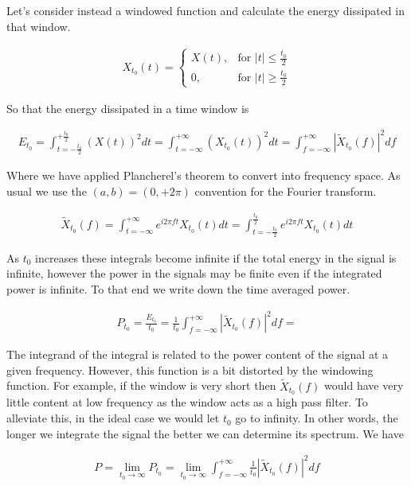 \documentclass[12pt]{article}
\begin{document}
Let's consider instead a windowed function and calculate the energy dissipated in that window.

\begin{align}
X_{t_0}(t) =
\begin{cases}
X(t), & \text{for } |t|\le \frac{t_0}{2}\\
0, & \text{for } |t|\ge \frac{t_0}{2}
\end{cases}
\end{align}

So that the energy dissipated in a time window is

\begin{align}
E_{t_0} = \int_{t=-\frac{t_0}{2}}^{+\frac{t_0}{2}} (X(t))^2 dt = \int_{t=-\infty}^{+\infty} (X_{t_0}(t))^2 dt = \int_{f=-\infty}^{+\infty} |\tilde{X}_{t_0}(f)|^2 df
\end{align}

Where we have applied Plancherel's theorem to convert into frequency space. As usual we use the $(a,b) = (0,+2\pi)$ convention for the Fourier transform.

\begin{align}
\tilde{X}_{t_0}(f) = \int_{t=-\infty}^{+\infty} e^{i 2\pi f t} X_{t_0}(t) dt = \int_{t=-\frac{t_0}{2}}^{\frac{t_0}{2}} e^{i 2\pi f t} X_{t_0}(t) dt
\end{align}

As $t_0$ increases these integrals become infinite if the total energy in the signal is infinite, however the power in the signals may be finite even if the integrated power is infinite. To that end we write down the time averaged power.

\begin{align}
P_{t_0} = \frac{E_{t_0}}{t_0} = \frac{1}{t_0} \int_{f=-\infty}^{+\infty} |\tilde{X}_{t_0}(f)|^2 df = 
\end{align}

The integrand of the integral is related to the power content of the signal at a given frequency. However, this function is a bit distorted by the windowing function. For example, if the window is very short then $\tilde{X}_{t_0}(f)$ would have very little content at low frequency as the window acts as a high pass filter. To alleviate this, in the ideal case we would let $t_0$ go to infinity. In other words, the longer we integrate the signal the better we can determine its spectrum. We have

\begin{align}
P = \lim_{t_0\rightarrow \infty} P_{t_0} = \lim_{t_0\rightarrow \infty}\int_{f=-\infty}^{+\infty}  \frac{1}{t_0}  |\tilde{X}_{t_0}(f)|^2 df
\end{align}
\end{document}

